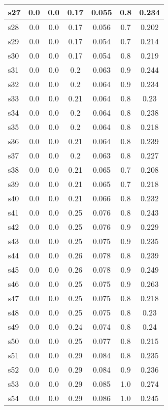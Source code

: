 \documentclass{article}
\begin{document}
\begin{tabular}{|l|c|c|c|c|c|c|}
\hline
s27 &0.0 & 0.0 & 0.17 & 0.055 & 0.8 & 0.234\\
\hline
s28 &0.0 & 0.0 & 0.17 & 0.056 & 0.7 & 0.202\\
\hline
s29 &0.0 & 0.0 & 0.17 & 0.054 & 0.7 & 0.214\\
\hline
s30 &0.0 & 0.0 & 0.17 & 0.054 & 0.8 & 0.219\\
\hline
s31 &0.0 & 0.0 & 0.2 & 0.063 & 0.9 & 0.244\\
\hline
s32 &0.0 & 0.0 & 0.2 & 0.064 & 0.9 & 0.234\\
\hline
s33 &0.0 & 0.0 & 0.21 & 0.064 & 0.8 & 0.23\\
\hline
s34 &0.0 & 0.0 & 0.2 & 0.064 & 0.8 & 0.238\\
\hline
s35 &0.0 & 0.0 & 0.2 & 0.064 & 0.8 & 0.218\\
\hline
s36 &0.0 & 0.0 & 0.21 & 0.064 & 0.8 & 0.239\\
\hline
s37 &0.0 & 0.0 & 0.2 & 0.063 & 0.8 & 0.227\\
\hline
s38 &0.0 & 0.0 & 0.21 & 0.065 & 0.7 & 0.208\\
\hline
s39 &0.0 & 0.0 & 0.21 & 0.065 & 0.7 & 0.218\\
\hline
s40 &0.0 & 0.0 & 0.21 & 0.066 & 0.8 & 0.232\\
\hline
s41 &0.0 & 0.0 & 0.25 & 0.076 & 0.8 & 0.243\\
\hline
s42 &0.0 & 0.0 & 0.25 & 0.076 & 0.9 & 0.229\\
\hline
s43 &0.0 & 0.0 & 0.25 & 0.075 & 0.9 & 0.235\\
\hline
s44 &0.0 & 0.0 & 0.26 & 0.078 & 0.8 & 0.239\\
\hline
s45 &0.0 & 0.0 & 0.26 & 0.078 & 0.9 & 0.249\\
\hline
s46 &0.0 & 0.0 & 0.25 & 0.075 & 0.9 & 0.263\\
\hline
s47 &0.0 & 0.0 & 0.25 & 0.075 & 0.8 & 0.218\\
\hline
s48 &0.0 & 0.0 & 0.25 & 0.075 & 0.8 & 0.23\\
\hline
s49 &0.0 & 0.0 & 0.24 & 0.074 & 0.8 & 0.24\\
\hline
s50 &0.0 & 0.0 & 0.25 & 0.077 & 0.8 & 0.215\\
\hline
s51 &0.0 & 0.0 & 0.29 & 0.084 & 0.8 & 0.235\\
\hline
s52 &0.0 & 0.0 & 0.29 & 0.084 & 0.9 & 0.236\\
\hline
s53 &0.0 & 0.0 & 0.29 & 0.085 & 1.0 & 0.274\\
\hline
s54 &0.0 & 0.0 & 0.29 & 0.086 & 1.0 & 0.245\\
\hline

\end{tabular}
\end{document}
